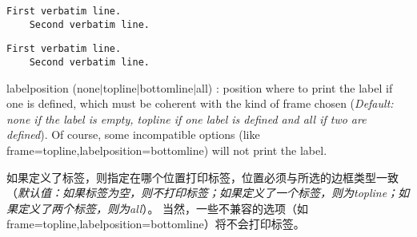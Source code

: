 \documentclass[twoside]{article}
\makeatletter
\providecommand\optname[1]{\textsf{#1}}
\newenvironment{optlist}{\begin{description}%
  \renewcommand\makelabel[1]{%
    \descriptionlabel{\mdseries\optname{##1}}}%
  \itemsep0.25\itemsep}%
 {\end{description}}
\def\thinskip{\hskip 0.16667em\relax}
\def\endash{--}
\def\emdash{\endash-}
\def\d@sh#1#2{\unskip#1\thinskip#2\thinskip\ignorespaces}
\def\Dash{\d@sh\nobreak\emdash}
\makeatother
\begin{document}
\endgroup


\begin{SideBySideExample}
  \begin{Verbatim}[frame=single,
                   label=My text]
    First verbatim line.
    Second verbatim line.
  \end{Verbatim}

  \begin{Verbatim}[frame=topline,
      framesep=4mm,
      label=\fbox{\Large\emph{The code}}]
    First verbatim line.
    Second verbatim line.
  \end{Verbatim}
\end{SideBySideExample}

\begin{optlist}
  \item[labelposition (none$\mid$topline$\mid$bottomline$\mid$all)]:
  position where to print the label if one is defined, which must be
  coherent with the kind of frame chosen
  (\emph{Default: none if the label is empty, topline if one label is
  defined and all if two are defined}).
  Of course, some incompatible options (like
  \textsf{frame=topline,labelposition=bottomline}) will not print the
  label.

  如果定义了标签，则指定在哪个位置打印标签，位置必须与所选的边框类型一致
（\emph{默认值：如果标签为空，则不打印标签；如果定义了一个标签，则为topline；如果定义了两个标签，则为all}）。
当然，一些不兼容的选项（如\textsf{frame=topline,labelposition=bottomline}）将不会打印标签。
\end{optlist}

\end{document}
